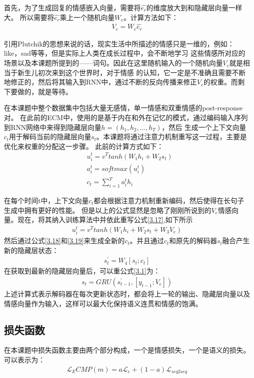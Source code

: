 \documentclass[supercite]{HustGraduPaper}
\theoremstyle{definition}
\begin{document}
首先，为了生成回复的情感嵌入向量，需要将$\hat{e_r}$的维度放大到和隐藏层向量一样大。
所以需要将$\hat{e_r}$乘上一个随机向量$W_e$。计算方法如下：
\begin{align}
  V_e = W_e \hat{e_r} \label{3.16} 
\end{align}

引用Plutchik的思想来说的话，现实生活中所描述的情感只是一维的，例如：like，sad等等，但是实际上人类在成长过程中，会不断地学习
这些情感所对应的场景以及本课题所提到的——词句。因此在这里随机输入的一个随机向量$V_e$就是相当于新生儿初次来到这个世界时，对于情感
的认知，它一定是不准确且需要不断地修正的，然后将其输入到RNN中，通过不断的反向传播来修正$V_e$的权重。而剩下要做的，就是等待。

在本课题中整个数据集中包括大量无感情，单一情感和双重情感的post-response对。
在此前的ECM中，使用的是基于内在和外在记忆的模式，通过编码输入序列到RNN网络中来得到隐藏层向量$h = (h_1,h_2,...,h_T)$，然后
生成一个上下文向量$c_t$用于解码当前的隐藏层向量$s_t$。本课题将通过注意力机制重写这一过程，主要是优化来权重的分配这一步骤。
此前的计算方式如下：
\begin{align}
  &u_i^t = v^T tanh(W_1h_i + W_2 s_t) \label{3.17}\\
  &a_i^t = softmax(u_i^t) \label{3.18}\\
  &c_t = \sum_{i=1}^T a_i^t h_i \label{3.19}
\end{align}

在每个时间t中，上下文向量$c_t$都会根据注意力机制重新编码，然后使得在长句子生成中拥有更好的性能。
但是以上的公式显然是忽略了刚刚所说到的$V_e$情感向量。现在，将其纳入训练算法中并依此重写公式\ref{3.17},如下所示
\begin{align}
  u_i^t = v^T tanh(W_1h_i + W_2 s_t + W_3V_e) \label{3.20}
\end{align}
然后通过公式\ref{3.18}和\ref{3.19}来生成全新的$c_t$。并且通过$c_t$和原先的解码器$s_t$融合产生新的隐藏层状态：
\begin{align}
  s^{'}_t = W_4[s_t;c_t] \label{3.21}
\end{align}
在获取到最新的隐藏层向量后，可以重公式\ref{3.1}为：
\begin{align}
  s_t = GRU(s^{'}_{t-1},[y_{t-1};V_e]) \label{3.22}
\end{align}
上述计算式表示解码器在每次更新状态时，都会将上一轮的输出、隐藏层向量以及情感向量作为输入，这样可以最大化保持语义连贯和情感的饱满。

\subsection{损失函数}
在本课题中损失函数主要由两个部分构成，一个是情感损失，一个是语义的损失。可以表示为：
\begin{align}
  \mathcal{L}_ECMP (m) = a \mathcal{L}_e + (1-a)\mathcal{L}_{seq2seq} \label{3.23}
\end{align}
\end{document}
